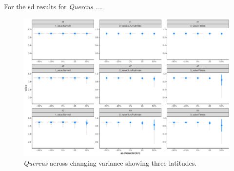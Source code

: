 \documentclass[11pt,letter]{article}
\begin{document}
\clearpage

For the sd results for \emph{Quercus} ....

\begin{figure} 
 \begin{center}
\noindent \includegraphics[width=1\textwidth]{..//analyses/graphs/phenofit/sims/metrics3/sdsim_3metricsQR.pdf}
  \caption{\emph{Quercus} across changing variance showing three latitudes.}
  \label{fig:quercussd3}
  \end{center}
\end{figure}
\end{document}
